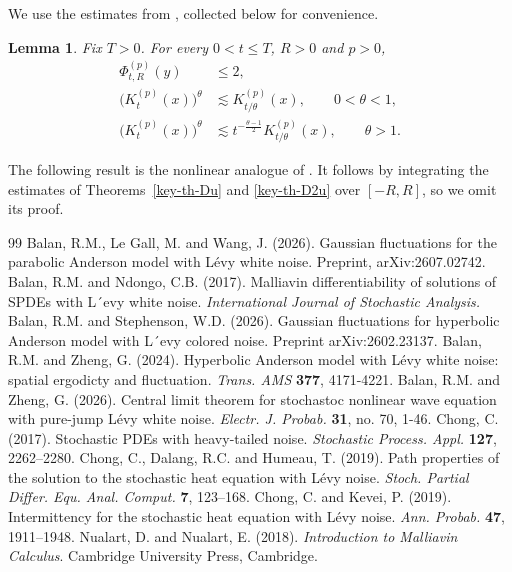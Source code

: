 \documentclass[10pt,a4paper]{amsart}
\newtheorem{lemma}[theorem]{Lemma}
\begin{document}
We use the estimates from \cite[Lemmas~4.3--4.5]{BLW26}, collected
below for convenience.
\begin{lemma}
Fix $T>0$. For every $0<t\le T$, $R>0$ and $p>0$,
\begin{align}
\label{Phi-bound}
\Phi_{t,R}^{(p)}(y)
&\le 2,
 \\
\label{K-power-bound}
\big(K_t^{(p)}(x)\big)^\theta
&\lesssim K_{t/\theta}^{(p)}(x),
\qquad 0<\theta<1,\\
\label{K-power-bound-large}
\big(K_t^{(p)}(x)\big)^\theta
&\lesssim t^{-\frac{\theta-1}{2}}K_{t/\theta}^{(p)}(x),
\qquad \theta>1.
\end{align}
\end{lemma}


The following result is the nonlinear analogue of
\cite[Lemma~4.2]{BLW26}. It follows by integrating the estimates of
Theorems~\ref{key-th-Du} and \ref{key-th-D2u} over $[-R,R]$, so we omit its proof.


\begin{thebibliography}{99}
 Balan, R.M., Le Gall, M. and Wang, J. (2026). Gaussian fluctuations for the parabolic Anderson model with L\'evy white noise. Preprint, arXiv:2607.02742.
 Balan, R.M. and Ndongo, C.B. (2017). Malliavin differentiability of solutions of SPDEs with L´evy white noise. {\em International Journal of Stochastic Analysis.} %
 Balan, R.M. and Stephenson, W.D. (2026). Gaussian fluctuations for hyperbolic Anderson model with L´evy colored noise. Preprint arXiv:2602.23137.
 Balan, R.M. and Zheng, G. (2024). Hyperbolic Anderson model with L\'evy white noise: spatial ergodicty and fluctuation. {\em Trans. AMS} {\bf 377}, 4171-4221.
 Balan, R.M. and Zheng, G. (2026). Central limit theorem for stochastoc nonlinear wave equation with pure-jump L\'evy white noise. {\em Electr. J. Probab.} {\bf 31}, no. 70, 1-46.
 Chong, C. (2017). Stochastic PDEs with heavy-tailed noise. {\em Stochastic Process. Appl.} {\bf 127}, 2262--2280.
 Chong, C., Dalang, R.C. and Humeau, T. (2019). Path properties of the solution to the stochastic heat equation with L\'evy noise. {\em Stoch. Partial Differ. Equ. Anal. Comput.} {\bf 7}, 123--168.
 Chong, C. and Kevei, P. (2019). Intermittency for the stochastic heat equation with L\'evy noise. {\em Ann. Probab.} {\bf 47}, 1911--1948.
 Nualart, D. and Nualart, E. (2018). {\em Introduction to Malliavin Calculus}. Cambridge University Press, Cambridge.
\end{thebibliography}
\end{document}
